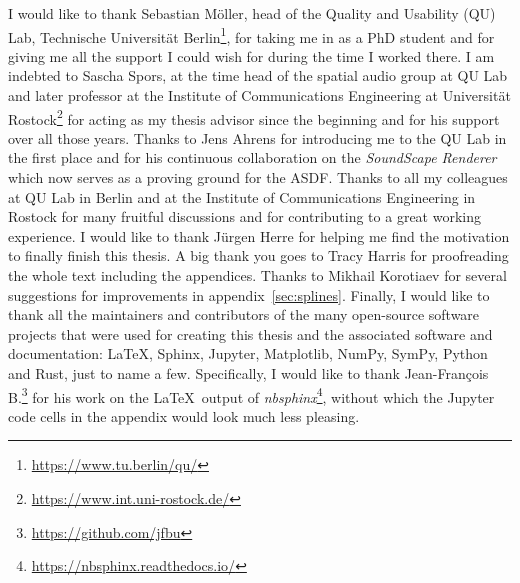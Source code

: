 I would like to thank Sebastian Möller,
head of the Quality and Usability (QU) Lab,
Technische Universität Berlin\footnote{\url{https://www.tu.berlin/qu/}},
for taking me in as a PhD student
and for giving me all the support I could wish for
during the time I worked there.
I am indebted to Sascha Spors,
at the time head of the spatial audio group at QU Lab and later professor
at the Institute of Communications Engineering at Universität
Rostock\footnote{\url{https://www.int.uni-rostock.de/}}
for acting as my thesis advisor since the beginning
and for his support over all those years.
Thanks to Jens Ahrens
for introducing me to the QU Lab in the first place
and for his continuous collaboration on the \emph{SoundScape Renderer}
which now serves as a proving ground for the ASDF.
Thanks to all my colleagues at QU Lab in Berlin
and at the Institute of Communications Engineering in Rostock
for many fruitful discussions
and for contributing to a great working experience.
I would like to thank Jürgen Herre
for helping me find the motivation to finally finish this thesis.
A big thank you goes to
Tracy Harris for proofreading the whole text including the appendices.
Thanks to Mikhail Korotiaev for several suggestions
for improvements in appendix~\ref{sec:splines}.
Finally, I would like to thank all the
maintainers and contributors of the many open-source software projects
that were used for creating this thesis and the associated software and
documentation: \LaTeX, Sphinx, Jupyter, Matplotlib, NumPy, SymPy,
Python and Rust, just to name a few.
Specifically, I would like to thank
Jean-François B.\footnote{\url{https://github.com/jfbu}}
for his work on the \LaTeX\ output of
\emph{nbsphinx}\footnote{\url{https://nbsphinx.readthedocs.io/}},
without which the Jupyter code cells in the appendix would look much
less pleasing.
